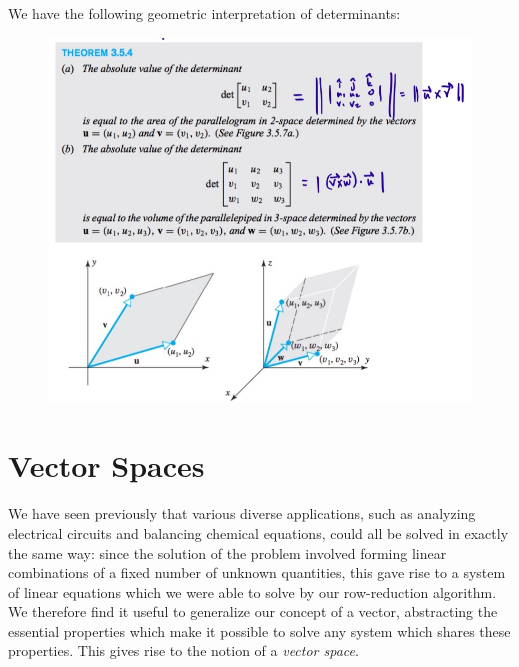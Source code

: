 \documentclass[12pt,letterpaper,reqno]{article}
\numberwithin{equation}{section}
\begin{document}
\begin{prop}
We have the following geometric interpretation of determinants:
	\begin{figure}[h]
			\begin{center}
				\includegraphics[scale=0.4]{figures_mvc/whole_enchilada}
			\end{center}
	\end{figure}
\end{prop}

\section{Vector Spaces}\label{sec:vector_spaces}
We have seen previously that various diverse applications, such as analyzing electrical circuits and balancing chemical equations, could all be solved in exactly the same way: since the solution of the problem involved forming linear combinations of a fixed number of unknown quantities, this gave rise to a system of linear equations which we were able to solve by our row-reduction algorithm. We therefore find it useful to generalize our concept of a vector, abstracting the essential properties which make it possible to solve any system which shares these properties. This gives rise to the notion of a \emph{vector space}.
\end{document}

